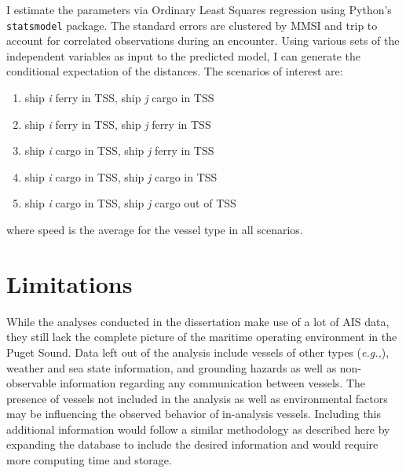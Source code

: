 \documentclass[twoside,symmetric,notoc]{tufte-book}
\newcommand{\hairsp}{\hspace{1pt}}
\newcommand{\eg}{\textit{e.\hairsp{}g.,}\hspace{3pt}}
\begin{document}
\par{%
I estimate the parameters via Ordinary Least Squares regression using Python's \texttt{statsmodel}\cite{seabold2010statsmodels} package. The standard errors are clustered by MMSI and trip to account for correlated observations during an encounter. Using various sets of the independent variables as input to the predicted model, I can generate the conditional expectation of the distances. The scenarios of interest are:
\begin{enumerate}
    \item ship \textit{i} ferry in TSS, ship \textit{j} cargo in TSS
    \item ship \textit{i} ferry in TSS, ship \textit{j} ferry in TSS
    \item ship \textit{i} cargo in TSS, ship \textit{j} ferry in TSS
    \item ship \textit{i} cargo in TSS, ship \textit{j} cargo in TSS
    \item ship \textit{i} cargo in TSS, ship \textit{j} cargo out of TSS
\end{enumerate}
where speed is the average for the vessel type in all scenarios.
}
\section{Limitations}
\par{%
While the analyses conducted in the dissertation make use of a lot of AIS data, they still lack the complete picture of the maritime operating environment in the Puget Sound. Data left out of the analysis include vessels of other types (\eg{fishing, recreational}), weather and sea state information, and grounding hazards as well as non-observable information regarding any communication between vessels. The presence of vessels not included in the analysis as well as environmental factors may be influencing the observed behavior of in-analysis vessels. Including this additional information would follow a similar methodology as described here by expanding the database to include the desired information and would require more computing time and storage.
}



\end{document}
